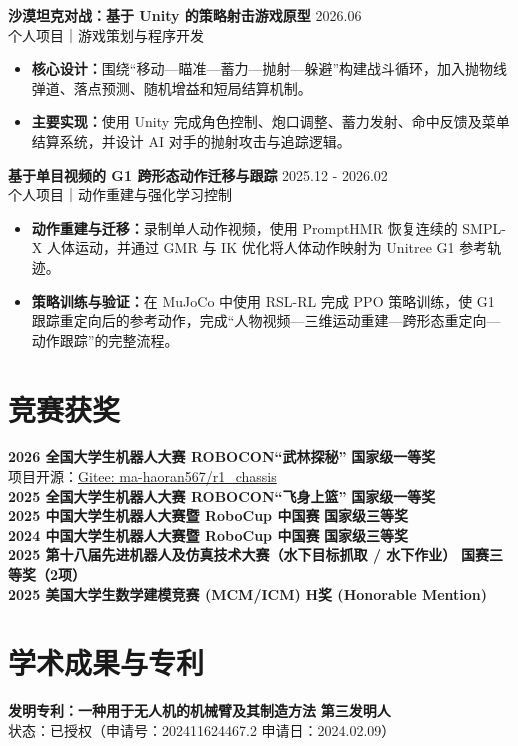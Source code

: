 \documentclass[11pt,a4paper]{article}
\begin{document}
\textbf{沙漠坦克对战：基于 Unity 的策略射击游戏原型} \hfill 2026.06 \\
{\small 个人项目｜游戏策划与程序开发}
\begin{itemize}[leftmargin=1.5em, noitemsep, topsep=2pt]
    \item \textbf{核心设计：}围绕“移动—瞄准—蓄力—抛射—躲避”构建战斗循环，加入抛物线弹道、落点预测、随机增益和短局结算机制。
    \item \textbf{主要实现：}使用 Unity 完成角色控制、炮口调整、蓄力发射、命中反馈及菜单结算系统，并设计 AI 对手的抛射攻击与追踪逻辑。
\end{itemize}

\textbf{基于单目视频的 G1 跨形态动作迁移与跟踪} \hfill 2025.12 - 2026.02 \\
{\small 个人项目｜动作重建与强化学习控制}
\begin{itemize}[leftmargin=1.5em, noitemsep, topsep=2pt]
    \item \textbf{动作重建与迁移：}录制单人动作视频，使用 PromptHMR 恢复连续的 SMPL-X 人体运动，并通过 GMR 与 IK 优化将人体动作映射为 Unitree G1 参考轨迹。
    \item \textbf{策略训练与验证：}在 MuJoCo 中使用 RSL-RL 完成 PPO 策略训练，使 G1 跟踪重定向后的参考动作，完成“人物视频—三维运动重建—跨形态重定向—动作跟踪”的完整流程。
\end{itemize}

\section{竞赛获奖}
\textbf{2026 全国大学生机器人大赛 ROBOCON“武林探秘”} \hfill \textbf{国家级一等奖}\\
{\small 项目开源：\href{https://gitee.com/ma-haoran567/r1_chassis}{Gitee: ma-haoran567/r1\_chassis}}\\
\textbf{2025 全国大学生机器人大赛 ROBOCON“飞身上篮”} \hfill \textbf{国家级一等奖}\\
\textbf{2025 中国大学生机器人大赛暨 RoboCup 中国赛} \hfill \textbf{国家级三等奖}\\
\textbf{2024 中国大学生机器人大赛暨 RoboCup 中国赛} \hfill \textbf{国家级三等奖}\\
\textbf{2025 第十八届先进机器人及仿真技术大赛（水下目标抓取 / 水下作业）} \hfill \textbf{国赛三等奖（2项）}\\
\textbf{2025 美国大学生数学建模竞赛 (MCM/ICM)} \hfill \textbf{H奖 (Honorable Mention)}

\section{学术成果与专利}
\textbf{发明专利：一种用于无人机的机械臂及其制造方法} \hfill \textbf{第三发明人} \\
{\small 状态：已授权（申请号：202411624467.2 \quad 申请日：2024.02.09）}
\end{document}
